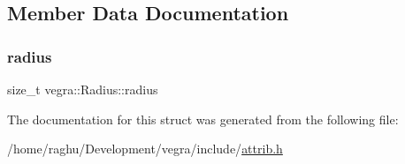 \subsection{Member Data Documentation}
\mbox{\label{structvegra_1_1Radius_add86636af00229833ff068a123fba5bf}} 
\subsubsection{\texorpdfstring{radius}{radius}}
{\footnotesize\ttfamily size\+\_\+t vegra\+::\+Radius\+::radius}



The documentation for this struct was generated from the following file\+:\begin{DoxyCompactItemize}
\item 
/home/raghu/\+Development/vegra/include/\mbox{\hyperlink{attrib_8h}{attrib.\+h}}\end{DoxyCompactItemize}
